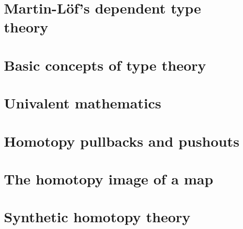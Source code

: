 \documentclass[11pt]{memoir} %
\begin{document}
\mainmatter

\renewcommand{\thechapter}{\Roman{chapter}}

\chapter{Martin-L\"of's dependent type theory}






%

\chapter{Basic concepts of type theory}






\chapter{Univalent mathematics}






\chapter{Homotopy pullbacks and pushouts}






\chapter{The homotopy image of a map}






\chapter{Synthetic homotopy theory}







\backmatter

\printbibliography

\printindex
\end{document}
